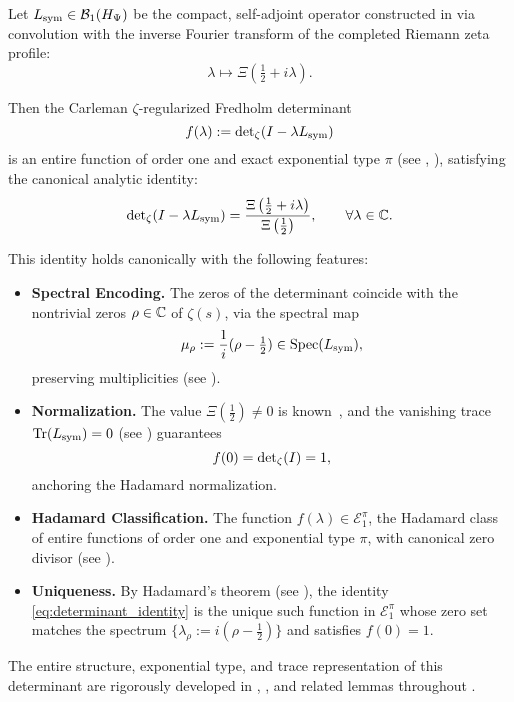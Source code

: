 \begin{theorem}
\label{thm:det_identity_revised}
\leavevmode
\begin{tcolorbox}[colback=gray!3!white,colframe=black!75!white,title={\textbf{Canonical Determinant Identity}}]
Let \( L_{\mathrm{sym}} \in \mathcal{B}_1(H_{\Psi}) \) be the compact, self-adjoint operator constructed in  via convolution with the inverse Fourier transform of the completed Riemann zeta profile:
\[
\lambda \mapsto \Xi\left( \tfrac{1}{2} + i\lambda \right).
\]

\medskip

Then the Carleman \(\zeta\)-regularized Fredholm determinant
\[
f(\lambda) := \det\nolimits_{\zeta}(I - \lambda L_{\mathrm{sym}})
\]
is an entire function of order one and exact exponential type \( \pi \) (see , ), satisfying the canonical analytic identity:
\begin{equation}
\det\nolimits_{\zeta}(I - \lambda L_{\mathrm{sym}})
= \frac{\Xi\left( \tfrac{1}{2} + i\lambda \right)}{\Xi\left( \tfrac{1}{2} \right)},
\qquad \forall \lambda \in \mathbb{C}.
\label{eq:determinant_identity}
\end{equation}

\medskip

This identity holds canonically with the following features:

\begin{itemize}
  \item \textbf{Spectral Encoding.} The zeros of the determinant coincide with the nontrivial zeros \( \rho \in \mathbb{C} \) of \( \zeta(s) \), via the spectral map
  \[
  \mu_\rho := \frac{1}{i}(\rho - \tfrac{1}{2}) \in \operatorname{Spec}(L_{\mathrm{sym}}),
  \]
  preserving multiplicities (see ).

  \item \textbf{Normalization.} The value \( \Xi(\tfrac{1}{2}) \ne 0 \) is known~\cite[Thm.~2.3]{Titchmarsh1986Zeta}, and the vanishing trace \(\operatorname{Tr}(L_{\mathrm{sym}}) = 0\) (see ) guarantees
  \[
  f(0) = \det\nolimits_{\zeta}(I) = 1,
  \]
  anchoring the Hadamard normalization.

  \item \textbf{Hadamard Classification.} The function \( f(\lambda) \in \mathcal{E}_1^\pi \), the Hadamard class of entire functions of order one and exponential type \( \pi \), with canonical zero divisor (see ).

  \item \textbf{Uniqueness.} By Hadamard’s theorem (see ), the identity \eqref{eq:determinant_identity} is the unique such function in \( \mathcal{E}_1^\pi \) whose zero set matches the spectrum \( \{ \lambda_\rho := i(\rho - \tfrac{1}{2}) \} \) and satisfies \( f(0) = 1 \).
\end{itemize}

The entire structure, exponential type, and trace representation of this determinant are rigorously developed in , , and related lemmas throughout .
\end{tcolorbox}
\end{theorem}
